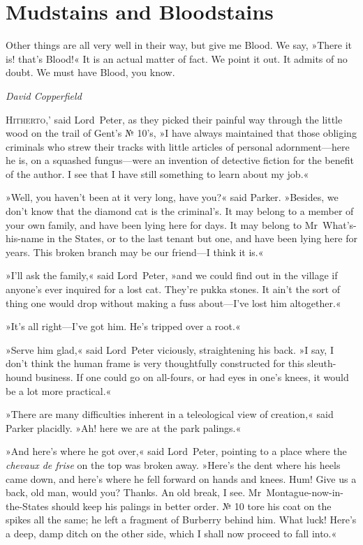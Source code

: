 \chapter{Mudstains and Bloodstains}

\epigraph{Other things are all very well in their way, but give me Blood\textellipsis . We say, »There it is! that's Blood!« It is an actual matter of fact. We point it out. It admits of no doubt\textellipsis . We must have Blood, you know.}{\textit{David Copperfield}}

\lettrine[lines=4,ante=`]{H}{itherto,}' said Lord~Peter, as they picked their painful way through the little wood on the trail of Gent's № 10's, »I have always maintained that those obliging criminals who strew their tracks with little articles of personal adornment—here he is, on a squashed fungus—were an invention of detective fiction for the benefit of the author. I see that I have still something to learn about my job.«

»Well, you haven't been at it very long, have you?« said Parker.  »Besides, we don't know that the diamond cat is the criminal's. It may belong to a member of your own family, and have been lying here for days. It may belong to Mr~What's-his-name in the States, or to the last tenant but one, and have been lying here for years. This broken branch may be our friend—I think it is.«

»I'll ask the family,« said Lord~Peter, »and we could find out in the village if anyone's ever inquired for a lost cat. They're pukka stones. It ain't the sort of thing one would drop without making a fuss about—I've lost him altogether.«

»It's all right—I've got him. He's tripped over a root.«

»Serve him glad,« said Lord~Peter viciously, straightening his back.  »I say, I don't think the human frame is very thoughtfully constructed for this sleuth-hound business. If one could go on all-fours, or had eyes in one's knees, it would be a lot more practical.«

»There are many difficulties inherent in a teleological view of creation,« said Parker placidly. »Ah! here we are at the park palings.«

»And here's where he got over,« said Lord~Peter, pointing to a place where the \textit{chevaux de frise} on the top was broken away. »Here's the dent where his heels came down, and here's where he fell forward on hands and knees. Hum! Give us a back, old man, would you? Thanks.  An old break, I see. Mr~Montague-now-in-the-States should keep his palings in better order. № 10 tore his coat on the spikes all the same; he left a fragment of Burberry behind him. What luck! Here's a deep, damp ditch on the other side, which I shall now proceed to fall into.«

